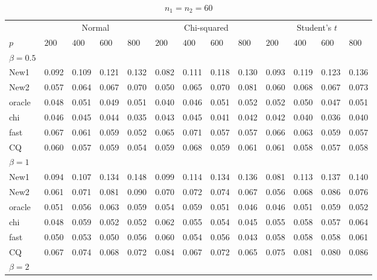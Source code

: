 \documentclass[review]{elsarticle}
\theoremstyle{plain}
\theoremstyle{definition}
\theoremstyle{remark}
\begin{document}
\begin{table}[ht]
\caption{$n_1=n_2=60$} 
\label{hahaha}
\vspace{3mm}
\centering
\begin{tabular}{lllllllllllll}
\toprule
    &   \multicolumn{4}{c}{Normal} & \multicolumn{4}{c}{Chi-squared}& \multicolumn{4}{c}{Student's $t$}  \\
    \cmidrule(r){2-5}
\cmidrule(r){6-9}
\cmidrule(r){10-13}
    $p$ & $200$ & $400$ & $600$ & $800$ & $200$ & $400$ & $600$ & $800$ & $200$ & $400$ & $600$ & $800$ \\ 
\midrule
    $\beta=0.5$\\
New1 & 0.092 & 0.109 & 0.121 & 0.132 & 0.082 & 0.111 & 0.118 & 0.130 & 0.093 & 0.119 & 0.123 & 0.136 \\ 
New2 & 0.057 & 0.064 & 0.067 & 0.070 & 0.050 & 0.065 & 0.070 & 0.081 & 0.060 & 0.068 & 0.067 & 0.073 \\ 
oracle & 0.048 & 0.051 & 0.049 & 0.051 & 0.040 & 0.046 & 0.051 & 0.052 & 0.052 & 0.050 & 0.047 & 0.051 \\ 
chi & 0.046 & 0.045 & 0.044 & 0.035 & 0.043 & 0.045 & 0.041 & 0.042 & 0.042 & 0.040 & 0.036 & 0.040 \\ 
fast & 0.067 & 0.061 & 0.059 & 0.052 & 0.065 & 0.071 & 0.057 & 0.057 & 0.066 & 0.063 & 0.059 & 0.057 \\ 
CQ & 0.060 & 0.057 & 0.059 & 0.054 & 0.059 & 0.068 & 0.059 & 0.061 & 0.061 & 0.058 & 0.057 & 0.058 \\ 
    $\beta=1$\\
New1 & 0.094 & 0.107 & 0.134 & 0.148 & 0.099 & 0.114 & 0.134 & 0.136 & 0.081 & 0.113 & 0.137 & 0.140 \\ 
New2 & 0.061 & 0.071 & 0.081 & 0.090 & 0.070 & 0.072 & 0.074 & 0.067 & 0.056 & 0.068 & 0.086 & 0.076 \\ 
oracle & 0.051 & 0.056 & 0.063 & 0.059 & 0.054 & 0.059 & 0.051 & 0.046 & 0.046 & 0.051 & 0.059 & 0.052 \\ 
chi & 0.048 & 0.059 & 0.052 & 0.052 & 0.062 & 0.055 & 0.054 & 0.045 & 0.055 & 0.058 & 0.057 & 0.064 \\ 
fast & 0.050 & 0.053 & 0.050 & 0.056 & 0.060 & 0.054 & 0.056 & 0.043 & 0.058 & 0.058 & 0.058 & 0.061 \\ 
CQ & 0.067 & 0.074 & 0.068 & 0.072 & 0.084 & 0.067 & 0.072 & 0.065 & 0.075 & 0.081 & 0.080 & 0.086 \\ 
    $\beta=2$\\

\end{tabular}
\end{table}
\end{document}
